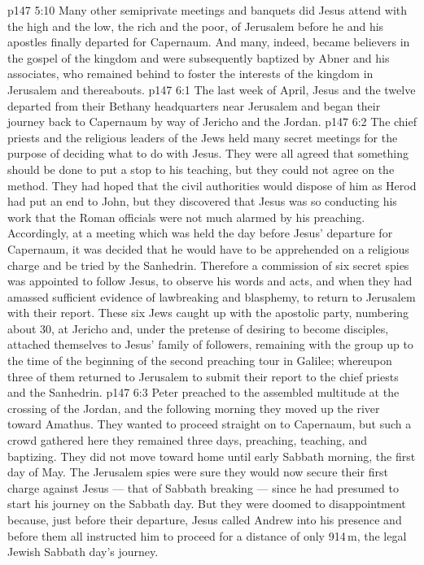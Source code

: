 \vs p147 5:10 \pc Many other semiprivate meetings and banquets did Jesus attend with the high and the low, the rich and the poor, of Jerusalem before he and his apostles finally departed for Capernaum. And many, indeed, became believers in the gospel of the kingdom and were subsequently baptized by Abner and his associates, who remained behind to foster the interests of the kingdom in Jerusalem and thereabouts.
\vs p147 6:1 The last week of April, Jesus and the twelve departed from their Bethany headquarters near Jerusalem and began their journey back to Capernaum by way of Jericho and the Jordan.
\vs p147 6:2 The chief priests and the religious leaders of the Jews held many secret meetings for the purpose of deciding what to do with Jesus. They were all agreed that something should be done to put a stop to his teaching, but they could not agree on the method. They had hoped that the civil authorities would dispose of him as Herod had put an end to John, but they discovered that Jesus was so conducting his work that the Roman officials were not much alarmed by his preaching. Accordingly, at a meeting which was held the day before Jesus’ departure for Capernaum, it was decided that he would have to be apprehended on a religious charge and be tried by the Sanhedrin. Therefore a commission of six secret spies was appointed to follow Jesus, to observe his words and acts, and when they had amassed sufficient evidence of lawbreaking and blasphemy, to return to Jerusalem with their report. These six Jews caught up with the apostolic party, numbering about 30, at Jericho and, under the pretense of desiring to become disciples, attached themselves to Jesus’ family of followers, remaining with the group up to the time of the beginning of the second preaching tour in Galilee; whereupon three of them returned to Jerusalem to submit their report to the chief priests and the Sanhedrin.
\vs p147 6:3 \pc Peter preached to the assembled multitude at the crossing of the Jordan, and the following morning they moved up the river toward Amathus. They wanted to proceed straight on to Capernaum, but such a crowd gathered here they remained three days, preaching, teaching, and baptizing. They did not move toward home until early Sabbath morning, the first day of May. The Jerusalem spies were sure they would now secure their first charge against Jesus --- that of Sabbath breaking --- since he had presumed to start his journey on the Sabbath day. But they were doomed to disappointment because, just before their departure, Jesus called Andrew into his presence and before them all instructed him to proceed for a distance of only 914\,m, the legal Jewish Sabbath day’s journey.
